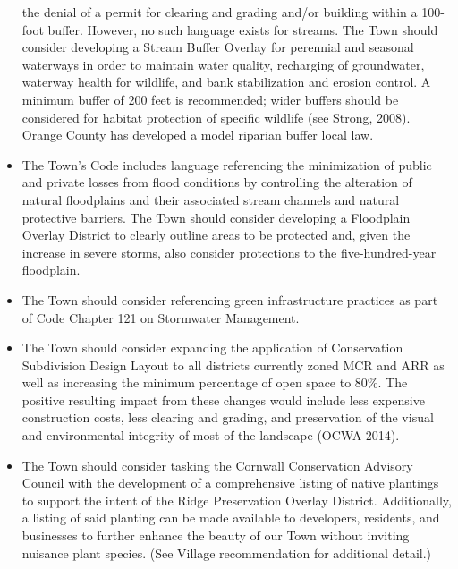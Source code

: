 \begin{itemize}
    the denial of a permit for clearing and grading and/or building within a 
    100-foot buffer. However, no such language exists for streams. The Town 
    should consider developing a Stream Buffer Overlay for perennial and 
    seasonal waterways in order to maintain water quality, recharging of 
    groundwater, waterway health for wildlife, and bank stabilization and 
    erosion control. A minimum buffer of 200 feet is recommended; wider buffers 
    should be considered for habitat protection of specific wildlife (see 
    Strong, 2008). Orange County has developed a model riparian buffer local 
    law.
    \item The Town’s Code includes language referencing the minimization of 
    public and private losses from flood conditions by controlling the 
    alteration of natural floodplains and their associated stream channels 
    and natural protective barriers.  The Town should consider developing a 
    Floodplain Overlay District to clearly outline areas to be protected 
    and, given the increase in severe storms, also consider protections to 
    the five-hundred-year floodplain.
    \item The Town should consider referencing green infrastructure practices 
    as part of Code Chapter 121 on Stormwater Management.
    \item The Town should consider expanding the application of Conservation 
    Subdivision Design Layout to all districts currently zoned MCR and ARR as 
    well as increasing the minimum percentage of open space to 80\%. The 
    positive resulting impact from these changes would include less expensive 
    construction costs, less clearing and grading, and preservation of the 
    visual and environmental integrity of most of the landscape (OCWA 2014).
    \item The Town should consider tasking the Cornwall Conservation Advisory 
    Council with the development of a comprehensive listing of native plantings 
    to support the intent of the Ridge Preservation Overlay District. 
    Additionally, a listing of said planting can be made available to 
    developers, residents, and businesses to further enhance the beauty of our 
    Town without inviting nuisance plant species. (See Village recommendation 
    for additional detail.)
\end{itemize}


\label{map:townzoning}

